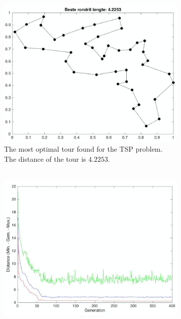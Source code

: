 
\begin{figure}[!]
\centering
\begin{subfigure}{.5\textwidth}
  \centering
  \includegraphics[width=.88\linewidth]{../figures/figures_question_4/belgium_tour_path}
  \caption{The most optimal tour found for the TSP problem. The distance of the tour is $4.2253$.\\ \ \\}
  \label{fig:belgium_tour_4_path}
\end{subfigure}%
\begin{subfigure}{.5\textwidth}
  \centering
  \includegraphics[width=.9\linewidth]{../figures/figures_question_4/belgium_tour_gen}

\end{subfigure}
\end{figure}
